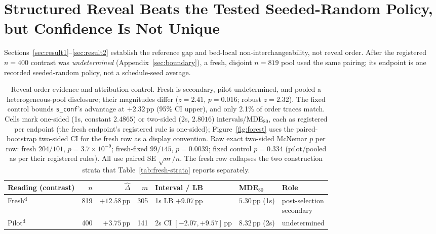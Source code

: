 \documentclass{article}
\newcommand{\sconf}{\texttt{s\_conf}}
\newcommand{\pp}{\,\mathrm{pp}}
\begin{document}
\section{Structured Reveal Beats the Tested Seeded-Random Policy, but Confidence Is Not Unique}
\label{sec:result3}

Sections~\ref{sec:result1}--\ref{sec:result2} establish the reference gap and
bed-local non-interchangeability, not reveal order.  After the registered
$n{=}400$ contrast was \emph{undetermined} (Appendix~\ref{sec:boundary}), a
fresh, disjoint $n{=}819$ pool used the same pairing; its endpoint is one
recorded seeded-random policy, not a schedule-seed average.

\begin{table}[t]
\centering
\footnotesize
\setlength{\parskip}{1pt}
\setlength{\tabcolsep}{1.9pt}
\caption{Reveal-order evidence and attribution control.  Fresh is secondary,
pilot undetermined, and pooled a heterogeneous-pool disclosure; their
magnitudes differ ($z{=}2.41$, $p{=}0.016$; robust $z{=}2.32$).  The fixed
control bounds \sconf{}'s advantage at $+2.32\pp$ (95\% CI upper), and only
2.1\% of order traces match.  Cells mark one-sided (1s, constant $2.4865$) or
two-sided (2s, $2.8016$) intervals/MDE$_{80}$, each as registered per endpoint
(the fresh endpoint's registered rule is one-sided); Figure~\ref{fig:forest}
uses the paired-bootstrap two-sided CI for the fresh row as a display
convention.  Raw exact two-sided McNemar $p$ per row: fresh $204/101$,
$p{=}3.7\!\times\!10^{-9}$; fresh-fixed $99/145$, $p{=}0.0039$; fixed
control $p{=}0.334$ (pilot/pooled as per their registered rules).
All use paired SE $\sqrt{m}/n$.  The fresh row collapses the two construction
strata that Table~\ref{tab:fresh-strata} reports separately.}
\label{tab:reveal-order-batches}
\begin{tabular*}{\textwidth}{@{\extracolsep{\fill}}lrrrlll@{}}
\toprule
Reading (contrast) & $n$ & $\widehat\Delta$ & $m$ & Interval / LB & MDE$_{80}$ & Role \\
\midrule
Fresh$^{\mathrm{d}}$ & 819 & $+12.58\pp$ & 305 & \shortstack[l]{1s LB\\$+9.07\pp$} & \shortstack[l]{$5.30\pp$\\(1s)} & \shortstack[l]{post-selection\\secondary} \\
Pilot$^{\mathrm{d}}$ & 400 & $+3.75\pp$ & 141 & \shortstack[l]{2s CI\\$[-2.07,+9.57]\pp$} & \shortstack[l]{$8.32\pp$\\(2s)} & undetermined \\

\end{tabular*}
\end{table}
\end{document}
